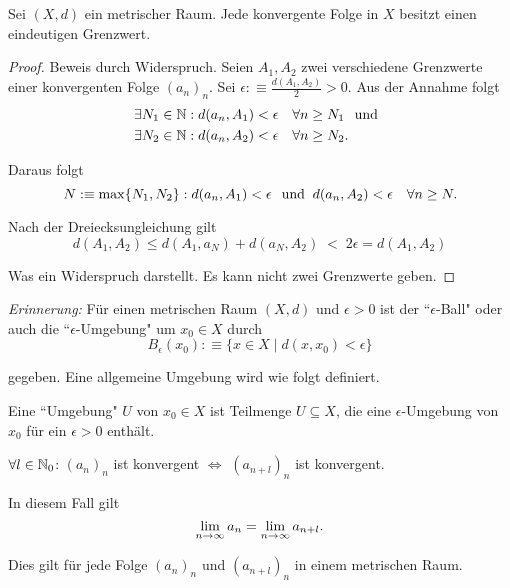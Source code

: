 \begin{thm}
	Sei $(X,d)$ ein metrischer Raum. Jede konvergente Folge in $X$ besitzt einen eindeutigen Grenzwert.
\end{thm}
\begin{proof} Beweis durch Widerspruch. Seien $A_1, A_2$ zwei verschiedene Grenzwerte einer konvergenten Folge $(a_n)_n$. Sei $\epsilon :\equiv \frac{d(A_1, A_2)}{2} > 0$. Aus der Annahme folgt
	\begin{equation}
		\begin{aligned}
			\exists N_1 \in \mathbb{N}: d(a_n, A_1) &< \epsilon \quad \forall n \geq N_1 \;\;\, \text{und}\;\; \\
			\exists N_2 \in \mathbb{N}: d(a_n, A_2) &< \epsilon \quad \forall n \geq N_2.
		\end{aligned}
	\end{equation}
	
	Daraus folgt
	\begin{equation}
		 N :\equiv \max \{ N_1, N_2 \} : d(a_n, A_1) < \epsilon \;\;\, \text{und}\;\; d(a_n, A_2) < \epsilon \quad \forall n \geq N.
	\end{equation}
	
	Nach der Dreiecksungleichung gilt
	\begin{equation}
		d(A_1, A_2) \leq d(A_1, a_N) + d(a_N, A_2) \; \boxed{<} \;  2\epsilon = d(A_1, A_2)
	\end{equation}
	
	Was ein Widerspruch darstellt. Es kann nicht zwei Grenzwerte geben.
\end{proof}

\emph{Erinnerung:} Für einen metrischen Raum $(X,d)$ und 
$\epsilon > 0$ ist der ``$\epsilon$-Ball" oder auch die ``$\epsilon$-Umgebung" um $x_0\in X$ durch
\begin{equation}
	B_{\epsilon} (x_0) :\equiv \{ x\in X \mid d(x, x_0) <\epsilon \}
\end{equation}

gegeben. Eine allgemeine Umgebung wird wie folgt definiert.

\setcounter{thm}{23}
\begin{mydef}[Umgebung]
	Eine ``Umgebung" $U$ von $x_0 \in X$ ist Teilmenge $U \subseteq X$, die eine $\epsilon$-Umgebung von $x_0$ für ein $\epsilon > 0$ enthält.
\end{mydef}

\begin{thm}[Indexverschiebung]
	$\forall l \in \mathbb{N}_0$: $(a_n)_n$ ist konvergent $\iff$ $(a_{n+l})_n$ ist konvergent.
	
	In diesem Fall gilt
	\begin{equation}
		\lim_{n \to \infty} a_n = \lim_{n \to \infty} a_{n+l}.
	\end{equation}
	
	Dies gilt für jede Folge $(a_n)_n$ und $(a_{n+l})_n$ in einem metrischen Raum.
\end{thm}


